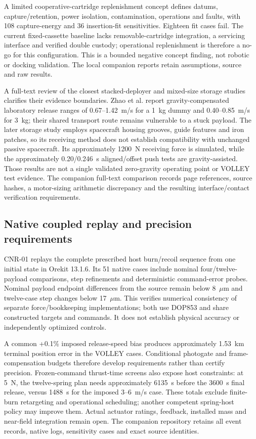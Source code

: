\documentclass[conference]{IEEEtran}
\begin{document}
A limited cooperative-cartridge replenishment concept defines datums, capture/retention, power isolation, contamination, operations and faults, with 108 capture-energy and 36 insertion-fit sensitivities. Eighteen fit cases fail. The current fixed-cassette baseline lacks removable-cartridge integration, a servicing interface and verified double custody; operational replenishment is therefore a no-go for this configuration. This is a bounded negative concept finding, not robotic or docking validation. The local companion reports retain assumptions, source and raw results.


A full-text review of the closest stacked-deployer and mixed-size storage studies clarifies their evidence boundaries. Zhao et al.\cite{stacked2022} report gravity-compensated laboratory release ranges of 0.67--1.42~m/s for a 1~kg dummy and 0.40--0.85~m/s for 3~kg; their shared transport route remains vulnerable to a stuck payload. The later storage study\cite{storage2025} employs spacecraft housing grooves, guide features and iron patches, so its receiving method does not establish compatibility with unchanged passive spacecraft. Its approximately 1200~N receiving force is simulated, while the approximately 0.20/0.246~s aligned/offset push tests are gravity-assisted. Those results are not a single validated zero-gravity operating point or VOLLEY test evidence. The companion full-text comparison records page references, source hashes, a motor-sizing arithmetic discrepancy and the resulting interface/contact verification requirements.


\subsection{Native coupled replay and precision requirements}
CNR-01 replays the complete prescribed host burn/recoil sequence from one initial state in Orekit 13.1.6. Its 51 native cases include nominal four/twelve-payload comparisons, step refinements and deterministic command-error probes. Nominal payload endpoint differences from the source remain below 8~$\mu$m and twelve-case step changes below 17~$\mu$m. This verifies numerical consistency of separate force/bookkeeping implementations; both use DOP853 and share constructed targets and commands. It does not establish physical accuracy or independently optimized controls.

A common +0.1\% imposed release-speed bias produces approximately 1.53~km terminal position error in the VOLLEY cases. Conditional photogate and frame-compensation budgets therefore develop requirements rather than certify precision. Frozen-command thrust-time screens also expose host constraints: at 5~N, the twelve-spring plan needs approximately 6135~s before the 3600~s final release, versus 1488~s for the imposed 3--6~m/s case. These totals exclude finite-burn retargeting and operational scheduling; another competent spring-host policy may improve them. Actual actuator ratings, feedback, installed mass and near-field integration remain open. The companion repository retains all event records, native logs, sensitivity cases and exact source identities.
\end{document}
